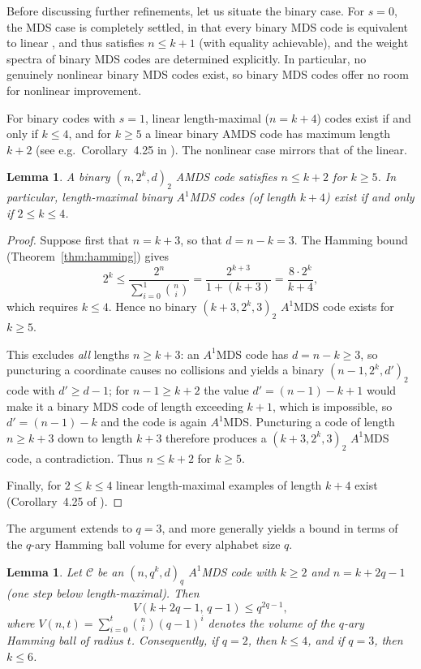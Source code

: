 \documentclass[12pt, letterpaper]{article}
\theoremstyle{plain}
\newtheorem{lemma}[theorem]{Lemma}
\theoremstyle{definition}
\begin{document}
	Before discussing further refinements, let us situate the binary case. For $s = 0$, the MDS case is completely settled, in that every binary MDS code is equivalent to linear \cite[Theorem~4]{Alderson2020}, and thus satisfies $n\le k+1$ (with equality achievable), and the weight spectra of binary MDS codes are determined explicitly. In particular, no genuinely nonlinear binary MDS codes exist, so binary MDS codes offer no room for nonlinear improvement.
	
	For binary codes with $s = 1$, linear length-maximal ($n=k+4$) codes exist if and only if $k \le 4$, and for $k \ge 5$ a linear binary AMDS code has maximum length $k+2$ (see e.g.\ Corollary~4.25 in \cite{alderson2025projectivesystems}). The nonlinear case mirrors that of the linear.

	\begin{lemma}\label{lem:binary_amds_bounds}
		A binary $(n, 2^k, d)_2$ AMDS code satisfies $n \le k+2$ for $k \ge 5$. In particular, length-maximal binary $A^1$MDS codes (of length $k+4$) exist
		if and only if $2 \le k \le 4$.
	\end{lemma}

	\begin{proof}
		Suppose first that $n = k+3$, so that $d = n-k = 3$. The Hamming bound (Theorem~\ref{thm:hamming}) gives
		\[ 2^k \le \frac{2^n}{\sum_{i=0}^{1} \binom{n}{i}} = \frac{2^{k+3}}{1 + (k+3)} =\frac{8 \cdot 2^k}{k+4}, \]
		which requires $k \le 4$. Hence no binary $(k+3, 2^k, 3)_2$ $A^1$MDS code exists for $k \ge 5$.

		This excludes \emph{all} lengths $n \ge k+3$: an $A^1$MDS code has $d = n-k \ge 3$, so puncturing a coordinate causes no collisions and yields a binary $(n-1, 2^k, d')_2$ code with $d' \ge d-1$; for $n-1 \ge k+2$ the value $d' = (n-1)-k+1$ would make it a binary MDS code of length exceeding $k+1$, which is impossible, so $d' = (n-1)-k$ and the code is again $A^1$MDS. Puncturing a code of length $n \ge k+3$ down to length $k+3$ therefore produces a $(k+3, 2^k, 3)_2$ $A^1$MDS code, a contradiction. Thus $n \le k+2$ for $k \ge 5$.

		Finally, for $2 \le k \le 4$ linear length-maximal examples of length $k+4$ exist (Corollary~4.25 of \cite{alderson2025projectivesystems}).
	\end{proof}
	The argument extends to $q = 3$, and more generally yields a bound in terms of the $q$-ary Hamming ball volume for every alphabet size $q$.
	
	\begin{lemma}\label{lem:qary_amds_hamming}
		Let $\mathcal{C}$ be an $(n, q^k, d)_q$ $A^1$MDS code with $k \ge 2$ and $n = k + 2q - 1$ (one step below length-maximal). Then
		\[
		V(k + 2q - 1,\, q-1) \le q^{2q-1},
		\]
		where $V(n, t) = \sum_{i=0}^{t} \binom{n}{i}(q-1)^i$ denotes the volume of the $q$-ary Hamming ball of radius $t$. Consequently, if $q = 2$, then $k \le 4$, and if $q = 3$, then $k \le 6$.
	\end{lemma}
	
\end{document}
